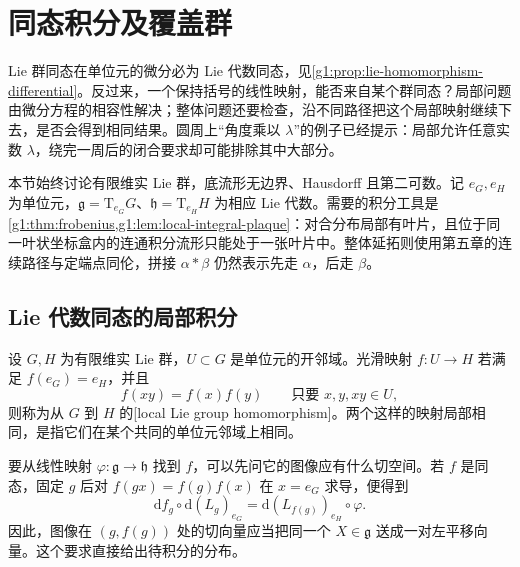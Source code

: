 
% 
% 
% 

\section{同态积分及覆盖群}
\label{g1:sec:1604}

Lie 群同态在单位元的微分必为 Lie 代数同态，见\cref{g1:prop:lie-homomorphism-differential}。反过来，一个保持括号的线性映射，能否来自某个群同态？局部问题由微分方程的相容性解决；整体问题还要检查，沿不同路径把这个局部映射继续下去，是否会得到相同结果。圆周上“角度乘以 \(\lambda\)”的例子已经提示：局部允许任意实数 \(\lambda\)，绕完一周后的闭合要求却可能排除其中大部分。

\ProseParagraphBreak

本节始终讨论有限维实 Lie 群，底流形无边界、Hausdorff 且第二可数。记 \(e_G,e_H\) 为单位元，\(\mathfrak g=\mathrm{T}_{e_G}G\)、\(\mathfrak h=\mathrm{T}_{e_H}H\) 为相应 Lie 代数。需要的积分工具是\cref{g1:thm:frobenius,g1:lem:local-integral-plaque}：对合分布局部有叶片，且位于同一叶状坐标盒内的连通积分流形只能处于一张叶片中。整体延拓则使用第五章的连续路径与定端点同伦，拼接 \(\alpha*\beta\) 仍然表示先走 \(\alpha\)，后走 \(\beta\)。

\subsection{Lie 代数同态的局部积分}
\label{g1:subsec:1604:01}

\begin{definition}
	\label{g1:def:local-lie-homomorphism}
	设 \(G,H\) 为有限维实 Lie 群，\(U\subset G\) 是单位元的开邻域。光滑映射 \(f:U\to H\) 若满足 \(f(e_G)=e_H\)，并且
	\[
		f(xy)=f(x)f(y)\qquad\text{只要 }x,y,xy\in U,
	\]
	则称为从 \(G\) 到 \(H\) 的[local Lie group homomorphism]。两个这样的映射局部相同，是指它们在某个共同的单位元邻域上相同。
\end{definition}

要从线性映射 \(\varphi:\mathfrak g\to\mathfrak h\) 找到 \(f\)，可以先问它的图像应有什么切空间。若 \(f\) 是同态，固定 \(g\) 后对 \(f(gx)=f(g)f(x)\) 在 \(x=e_G\) 求导，便得到
\[
	\mathrm{d}f_g\circ\mathrm{d}(L_g)_{e_G}
	=\mathrm{d}(L_{f(g)})_{e_H}\circ\varphi.
\]
因此，图像在 \((g,f(g))\) 处的切向量应当把同一个 \(X\in\mathfrak g\) 送成一对左平移向量。这个要求直接给出待积分的分布。

